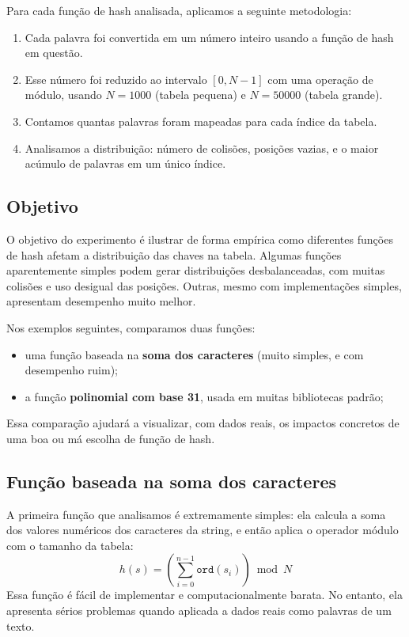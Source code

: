 Para cada função de hash analisada, aplicamos a seguinte metodologia:

\begin{enumerate}
  \item Cada palavra foi convertida em um número inteiro usando a função de hash em questão.
  \item Esse número foi reduzido ao intervalo $[0, N - 1]$ com uma operação de módulo, usando $N = 1000$ (tabela pequena) e $N = 50000$ (tabela grande).
  \item Contamos quantas palavras foram mapeadas para cada índice da tabela.
  \item Analisamos a distribuição: número de colisões, posições vazias, e o maior acúmulo de palavras em um único índice.
\end{enumerate}

\subsection*{Objetivo}

O objetivo do experimento é ilustrar de forma empírica como diferentes funções de hash afetam a distribuição das chaves na tabela. 
Algumas funções aparentemente simples podem gerar distribuições desbalanceadas, com muitas colisões e uso desigual das posições. Outras, mesmo com implementações simples, apresentam desempenho muito melhor.

Nos exemplos seguintes, comparamos duas funções:

\begin{itemize}
  \item uma função baseada na \textbf{soma dos caracteres} (muito simples, e com desempenho ruim);
  \item a função \textbf{polinomial com base 31}, usada em muitas bibliotecas padrão;
\end{itemize}

Essa comparação ajudará a visualizar, com dados reais, os impactos concretos de uma boa ou má escolha de função de hash.

\subsection*{Função baseada na soma dos caracteres}

A primeira função que analisamos é extremamente simples: ela calcula a soma dos valores numéricos dos caracteres da string, e então aplica o operador módulo com o tamanho da tabela:
\[
h(s) = \left( \sum_{i=0}^{n-1} \texttt{ord}(s_i) \right) \bmod N
\]
Essa função é fácil de implementar e computacionalmente barata. No entanto, ela apresenta sérios problemas quando aplicada a dados reais como palavras de um texto.

